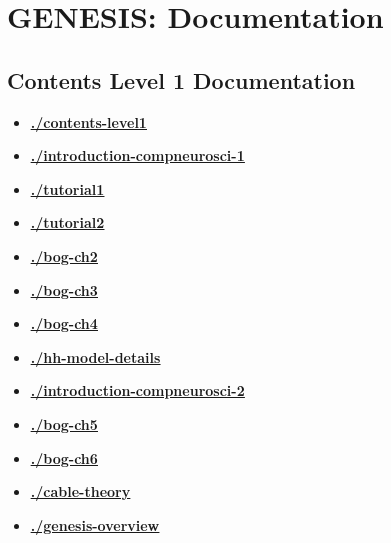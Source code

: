 \documentclass[12pt]{article}
\begin{document}
\section*{GENESIS: Documentation}

\subsection*{Contents Level 1 Documentation}

\begin{itemize}

\item \href{.././contents-level1/./contents-level1.pdf}{\bf \underline{./contents-level1}}

\item \href{.././introduction-compneurosci-1/./introduction-compneurosci-1.pdf}{\bf \underline{./introduction-compneurosci-1}}

\item \href{.././tutorial1/./tutorial1.pdf}{\bf \underline{./tutorial1}}

\item \href{.././tutorial2/./tutorial2.pdf}{\bf \underline{./tutorial2}}

\item \href{.././bog-ch2/./bog-ch2.pdf}{\bf \underline{./bog-ch2}}

\item \href{.././bog-ch3/./bog-ch3.pdf}{\bf \underline{./bog-ch3}}

\item \href{.././bog-ch4/./bog-ch4.pdf}{\bf \underline{./bog-ch4}}

\item \href{.././hh-model-details/./hh-model-details.pdf}{\bf \underline{./hh-model-details}}

\item \href{.././introduction-compneurosci-2/./introduction-compneurosci-2.pdf}{\bf \underline{./introduction-compneurosci-2}}

\item \href{.././bog-ch5/./bog-ch5.pdf}{\bf \underline{./bog-ch5}}

\item \href{.././bog-ch6/./bog-ch6.pdf}{\bf \underline{./bog-ch6}}

\item \href{.././cable-theory/./cable-theory.pdf}{\bf \underline{./cable-theory}}

\item \href{.././genesis-overview/./genesis-overview.pdf}{\bf \underline{./genesis-overview}}


\end{itemize}
\end{document}
